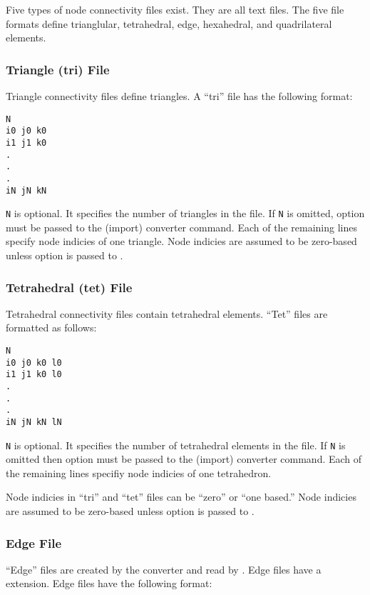 Five types of node connectivity files exist.  They are all text
files.  The five file formats define trianglular, tetrahedral, edge,
hexahedral, and quadrilateral elements.

\subsubsection{Triangle (tri) File}

Triangle connectivity files define triangles.  A ``tri'' file has the
following format:

\begin{verbatim}
N
i0 j0 k0
i1 j1 k0
.
.
.
iN jN kN
\end{verbatim}

\verb|N| is optional.  It specifies the number of triangles in the
file.  If \verb|N| is omitted, option  must
be passed to the (import) converter command.  Each of the remaining lines
specify node indicies of one triangle.  Node indicies are assumed to be
zero-based unless  option  is passed to
.


\subsubsection{Tetrahedral (tet) File}
Tetrahedral connectivity files contain tetrahedral elements.  ``Tet''
files are formatted as follows:

\begin{verbatim}
N
i0 j0 k0 l0
i1 j1 k0 l0
.
.
.
iN jN kN lN
\end{verbatim}

\verb|N| is optional.  It specifies the number of tetrahedral elements in the
file.  If \verb|N| is omitted then option  must
be passed to the (import) converter command.  Each of the remaining lines
specifiy node indicies of one tetrahedron.

Node indicies in ``tri'' and ``tet'' files can be ``zero'' or ``one
based.''  Node indicies are assumed to be
zero-based unless  option  is passed to
.  

\subsubsection{Edge File}

``Edge'' files are created by the converter 
and read by .  Edge files have a
 extension.  Edge files have the following format:

